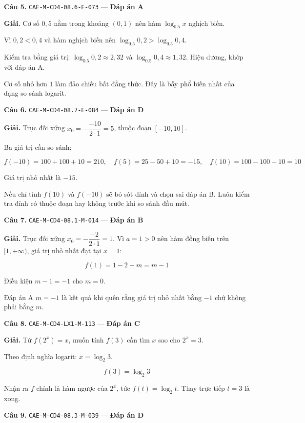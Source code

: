\documentclass[11pt, a4paper]{article}
\begin{document}
\textbf{Câu 5.} \texttt{CAE-M-CD4-08.6-E-073} — \textbf{Đáp án A}

\textbf{Giải.} Cơ số $0{,}5$ nằm trong khoảng $(0, 1)$ nên hàm $\log_{0.5} x$ nghịch biến.

Vì $0{,}2 < 0{,}4$ và hàm nghịch biến nên $\log_{0.5} 0{,}2 > \log_{0.5} 0{,}4$.

 Kiểm tra bằng giá trị: $\log_{0.5} 0{,}2 \approx 2{,}32$ và $\log_{0.5} 0{,}4 \approx 1{,}32$. Hiệu dương, khớp với đáp án A.

 Cơ số nhỏ hơn $1$ làm đảo chiều bất đẳng thức. Đây là bẫy phổ biến nhất của dạng so sánh logarit.

\textbf{Câu 6.} \texttt{CAE-M-CD4-08.7-E-084} — \textbf{Đáp án D}

\textbf{Giải.} Trục đối xứng $x_0 = -\dfrac{-10}{2 \cdot 1} = 5$, thuộc đoạn $[-10, 10]$.

Ba giá trị cần so sánh:

$$f(-10) = 100 + 100 + 10 = 210, \quad f(5) = 25 - 50 + 10 = -15, \quad f(10) = 100 - 100 + 10 = 10$$

Giá trị nhỏ nhất là $-15$.

 Nếu chỉ tính $f(10)$ và $f(-10)$ sẽ bỏ sót đỉnh và chọn sai đáp án B. Luôn kiểm tra đỉnh có thuộc đoạn hay không trước khi so sánh đầu mút.

\textbf{Câu 7.} \texttt{CAE-M-CD4-08.1-M-014} — \textbf{Đáp án B}

\textbf{Giải.} Trục đối xứng $x_0 = -\dfrac{-2}{2 \cdot 1} = 1$. Vì $a = 1 > 0$ nên hàm đồng biến trên $[1, +\infty)$, giá trị nhỏ nhất đạt tại $x = 1$:

$$f(1) = 1 - 2 + m = m - 1$$

Điều kiện $m - 1 = -1$ cho $m = 0$.

 Đáp án A $m = -1$ là kết quả khi quên rằng giá trị nhỏ nhất bằng $-1$ chứ không phải bằng $m$.

\textbf{Câu 8.} \texttt{CAE-M-CD4-LX1-M-113} — \textbf{Đáp án C}

\textbf{Giải.} Từ $f(2^x) = x$, muốn tính $f(3)$ cần tìm $x$ sao cho $2^x = 3$.

Theo định nghĩa logarit: $x = \log_2 3$.

$$f(3) = \log_2 3$$

 Nhận ra $f$ chính là hàm ngược của $2^x$, tức $f(t) = \log_2 t$. Thay trực tiếp $t = 3$ là xong.

\textbf{Câu 9.} \texttt{CAE-M-CD4-08.3-M-039} — \textbf{Đáp án D}
\end{document}
